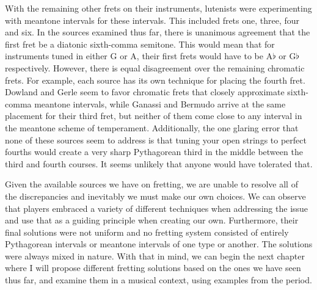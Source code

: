 With the remaining other frets on their instruments, lutenists were experimenting with
meantone intervals for these intervals.  This included frets one, three, four and six.
In the sources examined thus far, there is unanimous agreement that the first fret be a
diatonic sixth-comma semitone.  This would mean that for instruments tuned in either G
or A, their first frets would have to be A$\flat$ or G$\flat$ respectively. However,
there is equal disagreement over the remaining chromatic frets. For example, each
source has its own technique for placing the fourth fret.  Dowland and Gerle seem to
favor chromatic frets that closely approximate sixth-comma meantone intervals, while
Ganassi and Bermudo arrive at the same placement for their third fret, but neither of
them come close to any interval in the meantone scheme of temperament. Additionally,
the one glaring error that none of these sources seem to address is that tuning your
open strings to perfect fourths would create a very sharp Pythagorean third in the
middle between the third and fourth courses.  It seems unlikely that anyone would have
tolerated that.

Given the available sources we have on fretting, we are unable to resolve all of the
discrepancies and inevitably we must make our own choices.  We can observe that players
embraced a variety of different techniques when addressing the issue and use that as a
guiding principle when creating our own. Furthermore, their final solutions were not
uniform and no fretting system consisted of entirely Pythagorean intervals or meantone
intervals of one type or another.  The solutions were always mixed in nature.  With
that in mind, we can begin the next chapter where I will propose different fretting
solutions based on the ones we have seen thus far, and examine them in a musical
context, using examples from the period.
